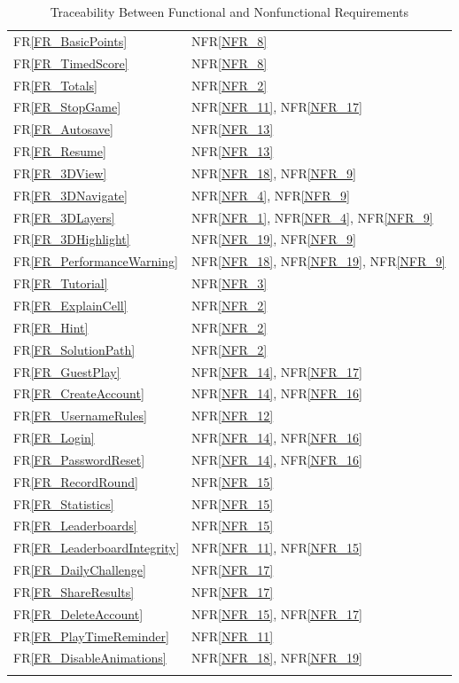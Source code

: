\documentclass[12pt]{article}
\newcommand{\rref}[1]{FR\ref{#1}}
\newcommand{\nfrref}[1]{NFR\ref{#1}}
\begin{document}
\begin{longtable}{p{} p{}}
\rref{FR_BasicPoints} & \nfrref{NFR_8} \\
\rref{FR_TimedScore} & \nfrref{NFR_8} \\
\rref{FR_Totals} & \nfrref{NFR_2} \\
\rref{FR_StopGame} & \nfrref{NFR_11}, \nfrref{NFR_17} \\
\rref{FR_Autosave} & \nfrref{NFR_13} \\
\rref{FR_Resume} & \nfrref{NFR_13} \\
\rref{FR_3DView} & \nfrref{NFR_18}, \nfrref{NFR_9} \\
\rref{FR_3DNavigate} & \nfrref{NFR_4}, \nfrref{NFR_9} \\
\rref{FR_3DLayers} & \nfrref{NFR_1}, \nfrref{NFR_4}, \nfrref{NFR_9} \\
\rref{FR_3DHighlight} & \nfrref{NFR_19}, \nfrref{NFR_9} \\
\rref{FR_PerformanceWarning} & \nfrref{NFR_18}, \nfrref{NFR_19}, \nfrref{NFR_9} \\
\rref{FR_Tutorial} & \nfrref{NFR_3} \\
\rref{FR_ExplainCell} & \nfrref{NFR_2} \\
\rref{FR_Hint} & \nfrref{NFR_2} \\
\rref{FR_SolutionPath} & \nfrref{NFR_2} \\
\rref{FR_GuestPlay} & \nfrref{NFR_14}, \nfrref{NFR_17} \\
\rref{FR_CreateAccount} & \nfrref{NFR_14}, \nfrref{NFR_16} \\
\rref{FR_UsernameRules} & \nfrref{NFR_12} \\
\rref{FR_Login} & \nfrref{NFR_14}, \nfrref{NFR_16} \\
\rref{FR_PasswordReset} & \nfrref{NFR_14}, \nfrref{NFR_16} \\
\rref{FR_RecordRound} & \nfrref{NFR_15} \\
\rref{FR_Statistics} & \nfrref{NFR_15} \\
\rref{FR_Leaderboards} & \nfrref{NFR_15} \\
\rref{FR_LeaderboardIntegrity} & \nfrref{NFR_11}, \nfrref{NFR_15} \\
\rref{FR_DailyChallenge} & \nfrref{NFR_17} \\
\rref{FR_ShareResults} & \nfrref{NFR_17} \\
\rref{FR_DeleteAccount} & \nfrref{NFR_15}, \nfrref{NFR_17} \\
\rref{FR_PlayTimeReminder} & \nfrref{NFR_11} \\
\rref{FR_DisableAnimations} & \nfrref{NFR_18}, \nfrref{NFR_19} \\
\bottomrule
\caption{Traceability Between Functional and Nonfunctional Requirements} \label{tab:FR2Rtm}
\end{longtable}
\end{document}
